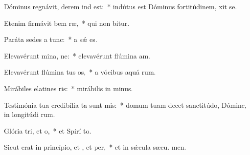\item Dóminus regnávit, derem ind est:~* indútus est Dóminus fortitúdinem,  xit se.
\item Etenim firmávit bem ræ,~* qui non bitur.
\item Paráta sedes a  tunc:~* a sǽ  es.
\item Elevavérunt mina, ne:~* elevavérunt flúmina  am.
\item Elevavérunt flúmina tus os,~* a vócibus aquá rum.
\item Mirábiles elatines ris:~* mirábilis in  minus.
\item Testimónia tua credibília ta sunt mis:~* domum tuam decet sanctitúdo, Dómine, in longitúdi rum.
\item Glória tri, et o,~* et Spirí to.
\item Sicut erat in princípio, et , et per,~* et in sǽcula sæcu. men.
